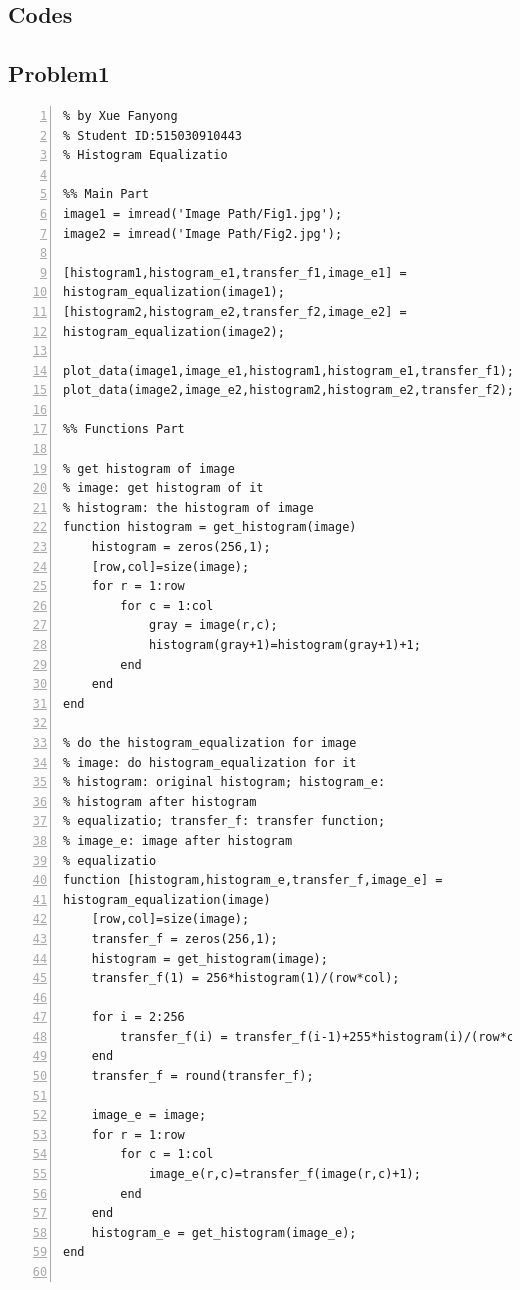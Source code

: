 \documentclass[11pt,oneside]{book}
\begin{document}
\begin{appendices}
\chapter{Codes}
\section{Problem1}

\begin{lstlisting}[numbers=left, numberstyle=\tiny,keywordstyle=\color{blue!70},commentstyle=\color{red!50!green!50!blue!50},frame=shadowbox, rulesepcolor=\color{red!20!green!20!blue!20}] 
% Problem 1
% by Xue Fanyong
% Student ID:515030910443
% Histogram Equalizatio

%% Main Part
image1 = imread('Image Path/Fig1.jpg');
image2 = imread('Image Path/Fig2.jpg');

[histogram1,histogram_e1,transfer_f1,image_e1] = 
histogram_equalization(image1);
[histogram2,histogram_e2,transfer_f2,image_e2] = 
histogram_equalization(image2);

plot_data(image1,image_e1,histogram1,histogram_e1,transfer_f1);
plot_data(image2,image_e2,histogram2,histogram_e2,transfer_f2);

%% Functions Part

% get histogram of image
% image: get histogram of it
% histogram: the histogram of image
function histogram = get_histogram(image)
    histogram = zeros(256,1);
    [row,col]=size(image);
    for r = 1:row
        for c = 1:col
            gray = image(r,c);
            histogram(gray+1)=histogram(gray+1)+1;
        end
    end
end

% do the histogram_equalization for image
% image: do histogram_equalization for it
% histogram: original histogram; histogram_e: 
% histogram after histogram
% equalizatio; transfer_f: transfer function; 
% image_e: image after histogram
% equalizatio
function [histogram,histogram_e,transfer_f,image_e] = 
histogram_equalization(image)
    [row,col]=size(image);
    transfer_f = zeros(256,1);
    histogram = get_histogram(image);
    transfer_f(1) = 256*histogram(1)/(row*col);
    
    for i = 2:256
        transfer_f(i) = transfer_f(i-1)+255*histogram(i)/(row*col);
    end
    transfer_f = round(transfer_f);
    
    image_e = image;
    for r = 1:row
        for c = 1:col
            image_e(r,c)=transfer_f(image(r,c)+1);
        end
    end
    histogram_e = get_histogram(image_e);
end


\end{lstlisting}
\end{appendices}
\end{document}

